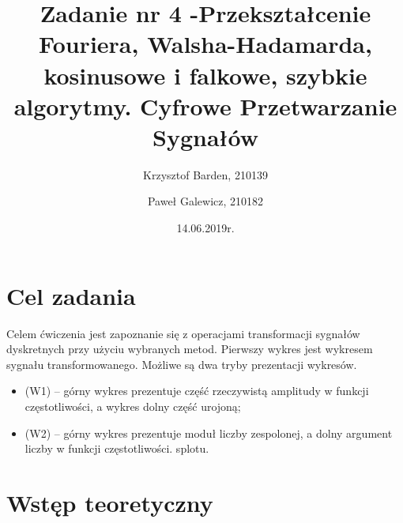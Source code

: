 \documentclass[12pt]{article}
\title{{\bf Zadanie nr 4 -Przekształcenie Fouriera, Walsha-Hadamarda, kosinusowe i falkowe,
szybkie algorytmy.}\linebreak
Cyfrowe Przetwarzanie Sygnałów}
\author{Krzysztof Barden, 210139 \and Paweł Galewicz, 210182}
\date{14.06.2019r.}
\begin{document}
\clearpage\maketitle
\thispagestyle{empty}
\newpage
\setcounter{page}{1}
\section{Cel zadania}

Celem ćwiczenia jest zapoznanie się z operacjami transformacji sygnałów dyskretnych
przy użyciu wybranych metod.
Pierwszy wykres jest wykresem sygnału transformowanego.
Możliwe są dwa tryby prezentacji wykresów. 
\begin{itemize}
\item (W1) – górny wykres prezentuje część rzeczywistą amplitudy w funkcji
częstotliwości, a wykres dolny część urojoną;
\item (W2) – górny wykres prezentuje moduł liczby zespolonej, a dolny argument liczby
w funkcji częstotliwości.
 splotu.
\end{itemize}

\section{Wstęp teoretyczny}
\end{document}
